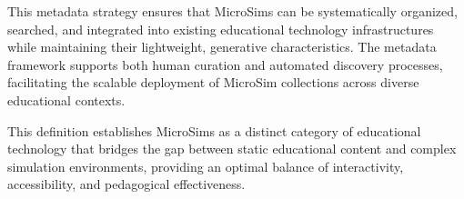 This metadata strategy ensures that MicroSims can be systematically organized, searched, and integrated into existing educational technology infrastructures while maintaining their lightweight, generative characteristics. The metadata framework supports both human curation and automated discovery processes, facilitating the scalable deployment of MicroSim collections across diverse educational contexts.

This definition establishes MicroSims as a distinct category of educational technology that bridges the gap between static educational content and complex simulation environments, providing an optimal balance of interactivity, accessibility, and pedagogical effectiveness.
